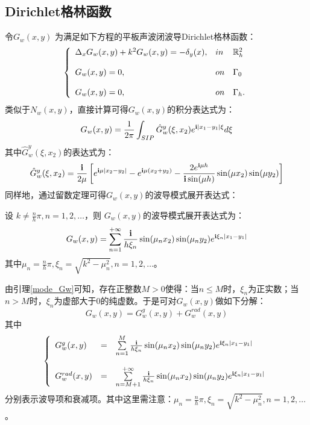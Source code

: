 \subsection{Dirichlet格林函数}
令$G_w(x,y)$ 为满足如下方程的平板声波闭波导Dirichlet格林函数：
\begin{eqnarray}\label{f_Gw}
\left\{
\begin{array}{lll}
\Delta_xG_w(x,y)+k^2G_w(x,y)=-\delta_y(x),&in& \mathbb{R}^2_h\\
& &\\
G_w(x,y)=0, &on&\Gamma_0\\
& &\\
G_w(x,y)=0, &on&\Gamma_h.
\end{array}
\right.
\end{eqnarray}
类似于$N_w(x,y)$，直接计算可得$G_w(x,y)$的积分表达式为：
\begin{equation}\label{f_Gw}
G_w(x,y)=\frac{1}{2\pi}\int_{SIP}\hat G_w^y(\xi,x_2)e^{\mathbf{i}|x_1-y_1|\xi}d\xi
\end{equation}
其中$\hat G_w^y(\xi,x_2)$的表达式为：
\begin{equation}
 \hat G_w^y(\xi,x_2)=\frac{\mathbf{i}}{2\mu}\left[e^{\mathbf{i}\mu|x_2-y_2|}-e^{\mathbf{i}\mu(x_2+y_2)}-\frac{2e^{\mathbf{i}\mu h}}{\mathbf{i}\sin(\mu h)}\sin(\mu x_2)\sin(\mu y_2)
 \right]
\end{equation}
同样地，通过留数定理可得$G_w(x,y)$的波导模式展开表达式：
\begin{lemma}\label{mode_Gw}
设 $k\neq\frac{n}{h}\pi, n=1,2,\ldots$，则 $G_w(x,y)$的波导模式展开表达式为：
\begin{equation}
   G_w(x,y)=\sum\limits_{n=1}^{+\infty}\frac{\mathbf{i}}{h\xi_n}\sin(\mu_nx_2)\sin(\mu_ny_2)e^{\mathbf{i}\xi_n|x_1-y_1|}
\end{equation}
其中$\mu_n=\frac{n}{h}\pi, \xi_n=\sqrt{k^2-\mu_n^2}, n=1,2,\ldots$。
\end{lemma}
\begin{remark}
	由引理\ref{mode_Gw}可知，存在正整数$ M>0$使得：当$n\leq M$时，$\xi_n$为正实数；当$n> M$时，$\xi_n$为虚部大于0的纯虚数。于是可对$G_w(x,y)$做如下分解：
	\begin{equation}
     G_w(x,y) = G_w^g(x,y)+G_w^{rad}(x,y)
	\end{equation}
	其中
	\begin{eqnarray}
	\left\{
	\begin{array}{lll}
	G_w^g(x,y)&=&\sum\limits_{n=1}^{ M}\frac{\mathbf{i}}{h\xi_n}\sin(\mu_nx_2)\sin(\mu_ny_2)e^{\mathbf{i}\xi_n|x_1-y_1|}\\
	& &\\
	G_w^{rad}(x,y)&=&\sum\limits_{n= M+1}^{+\infty}\frac{\mathbf{i}}{h\xi_n}\sin(\mu_nx_2)\sin(\mu_ny_2)e^{\mathbf{i}\xi_n|x_1-y_1|}
	\end{array}
	\right.
	\end{eqnarray}
	分别表示波导项和衰减项。其中这里需注意：$\mu_n=\frac{n}{h}\pi, \xi_n=\sqrt{k^2-\mu_n^2}, n=1,2,\ldots$。
	
\end{remark}
